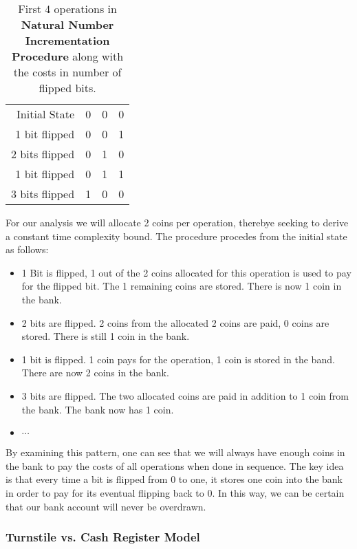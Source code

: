 \documentclass[12pt, letterpaper]{book}
\begin{document}
\begin{table}[h]
\centering
\begin{tabular}{r|c|c|c|}
\cline{2-4}
Initial State & 0 & 0 & 0 \\ \cline{2-4} 
1 bit flipped & 0 & 0 & 1 \\ \cline{2-4} 
2 bits flipped & 0 & 1 & 0 \\ \cline{2-4} 
1 bit flipped & 0 & 1 & 1 \\ \cline{2-4} 
3 bits flipped & 1 & 0 & 0 \\ \cline{2-4} 
\end{tabular}
\caption{First 4 operations in \textbf{Natural Number Incrementation Procedure} along with the costs in number of flipped bits.}
\label{figure:mantissa incrementation}
\end{table}

For our analysis we will allocate 2 coins per operation, therebye seeking to derive a constant time complexity bound. The procedure procedes from the initial state as follows:

\begin{itemize}
  \item 1 Bit is flipped, 1 out of the 2 coins allocated for this operation is used to pay for the flipped bit. The 1 remaining coins are stored. There is now 1 coin in the bank.
  \item 2 bits are flipped. 2 coins from the allocated 2 coins are paid, 0 coins are stored. There is still 1 coin in the bank.
  \item 1 bit is flipped. 1 coin pays for the operation, 1 coin is stored in the band. There are now 2 coins in the bank.
  \item 3 bits are flipped. The two allocated coins are paid in addition to 1 coin from the bank. The bank now has 1 coin.
  \item $\cdots$
\end{itemize}

By examining this pattern, one can see that we will always have enough coins in the bank to pay the costs of all operations when done in sequence. The key idea is that every time a bit is flipped from 0 to one, it stores one coin into the bank in order to pay for its eventual flipping back to 0. In this way, we can be certain that our bank account will never be overdrawn.

\subsubsection{Turnstile vs. Cash Register Model}
\end{document}
